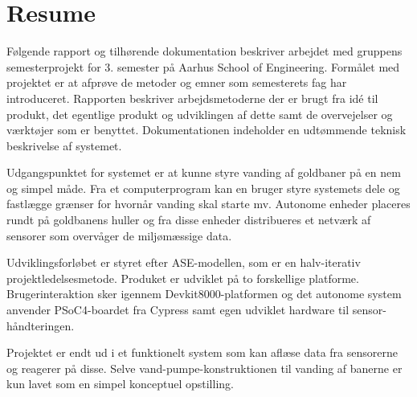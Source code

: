 
\chapter*{Resume}
Følgende rapport og tilhørende dokumentation beskriver arbejdet med gruppens semesterprojekt for 3. semester på Aarhus School of Engineering. Formålet med projektet er at afprøve de metoder og emner som semesterets fag har introduceret. Rapporten beskriver arbejdsmetoderne der er brugt fra idé til produkt, det egentlige produkt og udviklingen af dette samt de overvejelser og værktøjer som er benyttet. Dokumentationen indeholder en udtømmende teknisk beskrivelse af systemet.

Udgangspunktet for systemet er at kunne styre vanding af goldbaner på en nem og simpel måde. Fra et computerprogram kan en bruger styre systemets dele og fastlægge grænser for hvornår vanding skal starte mv. Autonome enheder placeres rundt på goldbanens huller og fra disse enheder distribueres et netværk af sensorer som overvåger de miljømæssige data.

Udviklingsforløbet er styret efter ASE-modellen, som er en halv-iterativ projektledelsesmetode. Produket er udviklet på to forskellige platforme. Brugerinteraktion sker igennem Devkit8000-platformen og det autonome system anvender PSoC4-boardet fra Cypress samt egen udviklet hardware til sensor-håndteringen. 

Projektet er endt ud i et funktionelt system som kan aflæse data fra sensorerne og reagerer på disse. Selve vand-pumpe-konstruktionen til vanding af banerne er kun lavet som en simpel konceptuel opstilling.